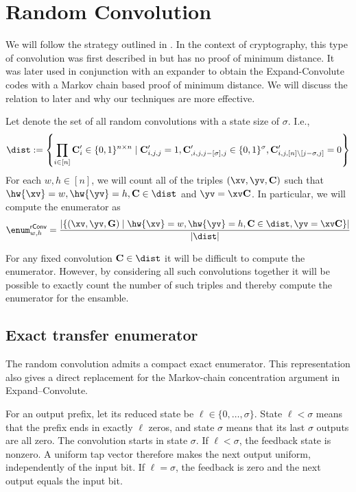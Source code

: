 

\section{Random Convolution}


We will follow the strategy outlined in . In the context of cryptography, this type of convolution was first described in \cite{silver} but has no proof of minimum distance. It was later used in conjunction with an expander to obtain the Expand-Convolute codes \cite{EC} with a Markov chain based proof of minimum distance. We will discuss the relation to \cite{EC} later and why our techniques are more effective. 

Let \dist denote the set of all random convolutions with a state size of $\sigma$. I.e.,
$$
\dist := \left\{ \prod_{i\in [n]}\C'_i\in \{0,1\}^{n\times n} \mid \C'_{i,j,j}=1, \C'_{,i,j,j-[\sigma],j}\in\{0,1\}^\sigma, \C'_{i,j,[n]\setminus [j-\sigma,j]}=0\right\}
$$
For each $w,h\in [n]$, we will count all of the triples $(\xv,\yv,\C)$ such that $\hw{\xv}=w,\hw{\yv}=h, \C\in \dist$ and $\yv = \xv\C$. In particular, we will compute the enumerator as 
$$
\enum^{\textsf{rConv}}_{w,h} = \frac{|\{(\xv,\yv,\G) \mid \hw{\xv}=w,\hw{\yv}=h, \C\in \dist, \yv = \xv\C \}|}{|\dist|}
$$

For any fixed convolution $\C\in \dist$ it will be difficult to compute the enumerator. However, by considering all such convolutions together it will be possible to exactly count the number of such triples and thereby compute the enumerator for the ensamble.

\subsection{Exact transfer enumerator}
\label{sec:nonwrapping-transfer-enumerator}

The random convolution admits a compact exact enumerator.  This representation
also gives a direct replacement for the Markov-chain concentration argument in
Expand--Convolute.

For an output prefix, let its reduced state be
$\ell\in\{0,\ldots,\sigma\}$.  State $\ell<\sigma$ means that the prefix ends
in exactly $\ell$ zeros, and state $\sigma$ means that its last $\sigma$
outputs are all zero.  The convolution starts in state $\sigma$.  If
$\ell<\sigma$, the feedback state is nonzero.  A uniform tap vector therefore
makes the next output uniform, independently of the input bit.  If
$\ell=\sigma$, the feedback is zero and the next output equals the input bit.

